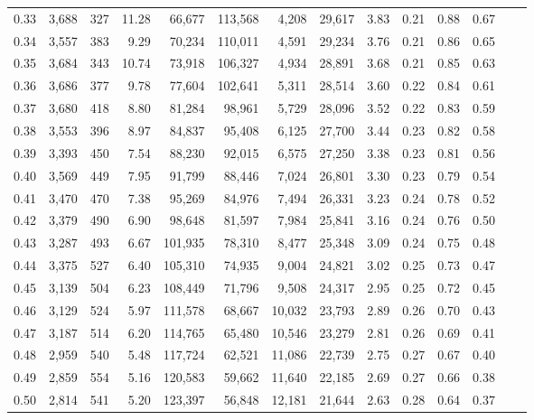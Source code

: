 \begin{tabular}{rrrrrrrrrrrrrr}
0.33 &  3,688 &  327 &   11.28 &   66,677 &  113,568 &   4,208 &  29,617 &  3.83 &  0.21 &  0.88 &      0.67 \\
0.34 &  3,557 &  383 &    9.29 &   70,234 &  110,011 &   4,591 &  29,234 &  3.76 &  0.21 &  0.86 &      0.65 \\
0.35 &  3,684 &  343 &   10.74 &   73,918 &  106,327 &   4,934 &  28,891 &  3.68 &  0.21 &  0.85 &      0.63 \\
0.36 &  3,686 &  377 &    9.78 &   77,604 &  102,641 &   5,311 &  28,514 &  3.60 &  0.22 &  0.84 &      0.61 \\
0.37 &  3,680 &  418 &    8.80 &   81,284 &   98,961 &   5,729 &  28,096 &  3.52 &  0.22 &  0.83 &      0.59 \\
0.38 &  3,553 &  396 &    8.97 &   84,837 &   95,408 &   6,125 &  27,700 &  3.44 &  0.23 &  0.82 &      0.58 \\
0.39 &  3,393 &  450 &    7.54 &   88,230 &   92,015 &   6,575 &  27,250 &  3.38 &  0.23 &  0.81 &      0.56 \\
0.40 &  3,569 &  449 &    7.95 &   91,799 &   88,446 &   7,024 &  26,801 &  3.30 &  0.23 &  0.79 &      0.54 \\
0.41 &  3,470 &  470 &    7.38 &   95,269 &   84,976 &   7,494 &  26,331 &  3.23 &  0.24 &  0.78 &      0.52 \\
0.42 &  3,379 &  490 &    6.90 &   98,648 &   81,597 &   7,984 &  25,841 &  3.16 &  0.24 &  0.76 &      0.50 \\
0.43 &  3,287 &  493 &    6.67 &  101,935 &   78,310 &   8,477 &  25,348 &  3.09 &  0.24 &  0.75 &      0.48 \\
0.44 &  3,375 &  527 &    6.40 &  105,310 &   74,935 &   9,004 &  24,821 &  3.02 &  0.25 &  0.73 &      0.47 \\
0.45 &  3,139 &  504 &    6.23 &  108,449 &   71,796 &   9,508 &  24,317 &  2.95 &  0.25 &  0.72 &      0.45 \\
0.46 &  3,129 &  524 &    5.97 &  111,578 &   68,667 &  10,032 &  23,793 &  2.89 &  0.26 &  0.70 &      0.43 \\
0.47 &  3,187 &  514 &    6.20 &  114,765 &   65,480 &  10,546 &  23,279 &  2.81 &  0.26 &  0.69 &      0.41 \\
0.48 &  2,959 &  540 &    5.48 &  117,724 &   62,521 &  11,086 &  22,739 &  2.75 &  0.27 &  0.67 &      0.40 \\
0.49 &  2,859 &  554 &    5.16 &  120,583 &   59,662 &  11,640 &  22,185 &  2.69 &  0.27 &  0.66 &      0.38 \\
0.50 &  2,814 &  541 &    5.20 &  123,397 &   56,848 &  12,181 &  21,644 &  2.63 &  0.28 &  0.64 &      0.37 \\

\end{tabular}
